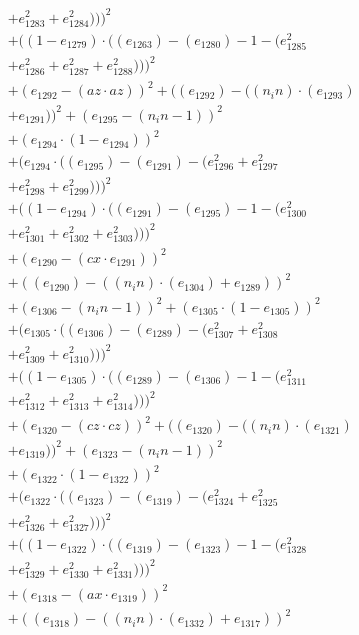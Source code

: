 \documentclass[10pt, a4paper]{article}
\begin{document}
\begin{align*}
& + e_{1283}^{2} + e_{1284}^{2})))^{2} \\
& + ((1 - e_{1279})  \cdot  ((e_{1263}) - (e_{1280}) - 1 - (e_{1285}^{2} \\
& + e_{1286}^{2} + e_{1287}^{2} + e_{1288}^{2})))^{2} \\
& + (e_{1292} - (az  \cdot  az))^{2} + ((e_{1292}) - ((n_in)  \cdot  (e_{1293}) \\
& + e_{1291}))^{2} + (e_{1295} - (n_in - 1))^{2} \\
& + (e_{1294}  \cdot  (1 - e_{1294}))^{2} \\
& + (e_{1294}  \cdot  ((e_{1295}) - (e_{1291}) - (e_{1296}^{2} + e_{1297}^{2} \\
& + e_{1298}^{2} + e_{1299}^{2})))^{2} \\
& + ((1 - e_{1294})  \cdot  ((e_{1291}) - (e_{1295}) - 1 - (e_{1300}^{2} \\
& + e_{1301}^{2} + e_{1302}^{2} + e_{1303}^{2})))^{2} \\
& + (e_{1290} - (cx  \cdot  e_{1291}))^{2} \\
& + ((e_{1290}) - ((n_in)  \cdot  (e_{1304}) + e_{1289}))^{2} \\
& + (e_{1306} - (n_in - 1))^{2} + (e_{1305}  \cdot  (1 - e_{1305}))^{2} \\
& + (e_{1305}  \cdot  ((e_{1306}) - (e_{1289}) - (e_{1307}^{2} + e_{1308}^{2} \\
& + e_{1309}^{2} + e_{1310}^{2})))^{2} \\
& + ((1 - e_{1305})  \cdot  ((e_{1289}) - (e_{1306}) - 1 - (e_{1311}^{2} \\
& + e_{1312}^{2} + e_{1313}^{2} + e_{1314}^{2})))^{2} \\
& + (e_{1320} - (cz  \cdot  cz))^{2} + ((e_{1320}) - ((n_in)  \cdot  (e_{1321}) \\
& + e_{1319}))^{2} + (e_{1323} - (n_in - 1))^{2} \\
& + (e_{1322}  \cdot  (1 - e_{1322}))^{2} \\
& + (e_{1322}  \cdot  ((e_{1323}) - (e_{1319}) - (e_{1324}^{2} + e_{1325}^{2} \\
& + e_{1326}^{2} + e_{1327}^{2})))^{2} \\
& + ((1 - e_{1322})  \cdot  ((e_{1319}) - (e_{1323}) - 1 - (e_{1328}^{2} \\
& + e_{1329}^{2} + e_{1330}^{2} + e_{1331}^{2})))^{2} \\
& + (e_{1318} - (ax  \cdot  e_{1319}))^{2} \\
& + ((e_{1318}) - ((n_in)  \cdot  (e_{1332}) + e_{1317}))^{2} \\

\end{align*}
\end{document}
